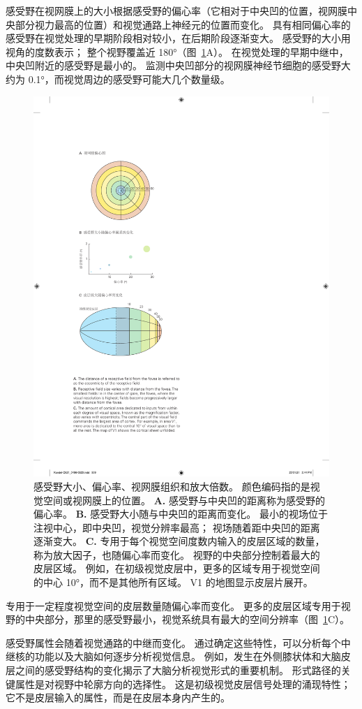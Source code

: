 感受野在视网膜上的大小根据感受野的偏心率（它相对于中央凹的位置，视网膜中央部分视力最高的位置）和视觉通路上神经元的位置而变化。
具有相同偏心率的感受野在视觉处理的早期阶段相对较小，在后期阶段逐渐变大。
感受野的大小用视角的度数表示；
整个视野覆盖近 180°（图~\ref{fig:21_10}A）。
在视觉处理的早期中继中，中央凹附近的感受野是最小的。
监测中央凹部分的视网膜神经节细胞的感受野大约为 0.1°，而视觉周边的感受野可能大几个数量级。


\begin{figure}[htbp]
	\centering
	\includegraphics[width=0.55\linewidth]{chap21/fig_21_10}
	\caption{感受野大小、偏心率、视网膜组织和放大倍数。
		颜色编码指的是视觉空间或视网膜上的位置。
		\textbf{A.} 感受野与中央凹的距离称为感受野的偏心率。
		\textbf{B.} 感受野大小随与中央凹的距离而变化。
		最小的视场位于注视中心，即中央凹，视觉分辨率最高；
		视场随着距中央凹的距离逐渐变大。
		\textbf{C.} 专用于每个视觉空间度数内输入的皮层区域的数量，称为放大因子，也随偏心率而变化。
		视野的中央部分控制着最大的皮层区域。
		例如，在初级视觉皮层中，更多的区域专用于视觉空间的中心 10°，而不是其他所有区域。
		V1 的地图显示皮层片展开。}
	\label{fig:21_10}
\end{figure}


专用于一定程度视觉空间的皮层数量随偏心率而变化。
更多的皮层区域专用于视野的中央部分，那里的感受野最小，视觉系统具有最大的空间分辨率（图~\ref{fig:21_10}C）。


感受野属性会随着视觉通路的中继而变化。
通过确定这些特性，可以分析每个中继核的功能以及大脑如何逐步分析视觉信息。
例如，发生在外侧膝状体和大脑皮层之间的感受野结构的变化揭示了大脑分析视觉形式的重要机制。
形式路径的关键属性是对视野中轮廓方向的选择性。
这是初级视觉皮层信号处理的涌现特性；
它不是皮层输入的属性，而是在皮层本身内产生的。


